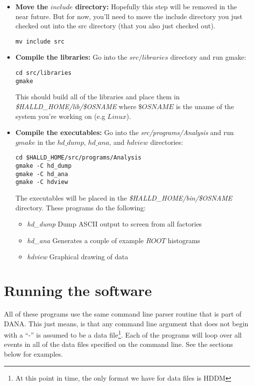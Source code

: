 \documentclass[12pt]{article}
\begin{document}
\begin{itemize}
	\item{\bf Move the $include$ directory:} Hopefully this step will be
	removed in the near future. But for now, you'll need to move the
	include directory you just checked out into the src directory
	(that you also just checked out).

		\begin{lstlisting}[frame=shadowbox,backgroundcolor=\color{cmdbkgd}]
mv include src
		\end{lstlisting}
	
	\item{\bf Compile the libraries:} Go into the $src/libraries$ directory
	and run gmake:

		\begin{lstlisting}[frame=shadowbox,backgroundcolor=\color{cmdbkgd}]
cd src/libraries
gmake
		\end{lstlisting}

	This should build all of the libraries and place them in
	{\it \$HALLD\_HOME/lib/\$OSNAME} where $\$OSNAME$ is the uname of
	the system you're working on (e.g $Linux$).

	\item{\bf Compile the executables:} Go into the {\it src/programs/Analysis}
	and run $gmake$ in the $hd\_dump$, $hd\_ana$, and $hdview$ directories:

		\begin{lstlisting}[frame=shadowbox,backgroundcolor=\color{cmdbkgd}]
cd $HALLD_HOME/src/programs/Analysis
gmake -C hd_dump
gmake -C hd_ana
gmake -C hdview
		\end{lstlisting}
		
	The executables will be placed in the {\it \$HALLD\_HOME/bin/\$OSNAME}
	directory. These programs do the following:
	\begin{itemize}
		\item{\it hd\_dump} Dump ASCII output to screen from all factories
		\item{\it hd\_ana} Generates a couple of example $ROOT$ histograms
		\item{\it hdview} Graphical drawing of data
	\end{itemize}
	
\end{itemize}

\section{Running the software}
All of these programs use the same command line parser routine
that is part of DANA. This just means, is that any command
line argument that does not begin with a ``-'' is assumed to be 
a data file\footnote{At this point in time, the only format we have
for data files is HDDM}. Each of the programs will loop over
all events in all of the data files specified on the command line.
See the sections below for examples.
\end{document}
